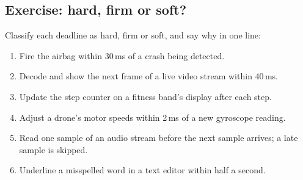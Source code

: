 \subsection{Exercise: hard, firm or soft?}
Classify each deadline as hard, firm or soft, and say why in one line:
\begin{enumerate}
    \item Fire the airbag within 30\,ms of a crash being detected.
    \item Decode and show the next frame of a live video stream within 40\,ms.
    \item Update the step counter on a fitness band's display after each step.
    \item Adjust a drone's motor speeds within 2\,ms of a new gyroscope reading.
    \item Read one sample of an audio stream before the next sample arrives; a late sample is skipped.
    \item Underline a misspelled word in a text editor within half a second.
\end{enumerate}
